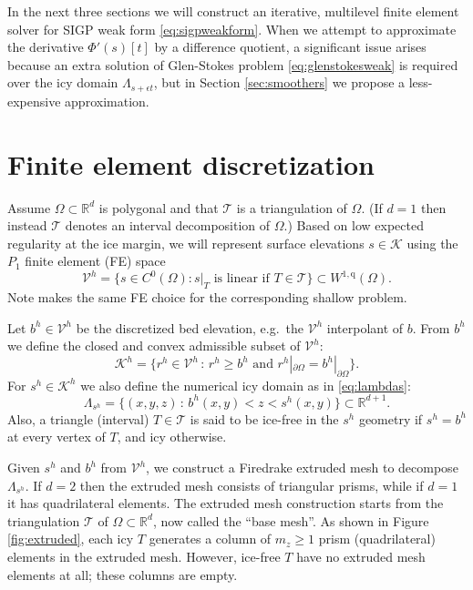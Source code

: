 \documentclass[letterpaper,final,12pt,reqno]{amsart}
\theoremstyle{claim}
\newcommand{\eps}{\epsilon}
\newcommand{\RR}{\mathbb{R}}
\newcommand{\qq}{{\text{q}}}
\numberwithin{equation}{section}
\numberwithin{figure}{section}
\numberwithin{table}{section}
\numberwithin{theorem}{section}
\begin{document}
In the next three sections we will construct an iterative, multilevel finite element solver for SIGP weak form \eqref{eq:sigpweakform}.  When we attempt to approximate the derivative $\Phi'(s)[t]$ by a difference quotient, a significant issue arises because an extra solution of Glen-Stokes problem \eqref{eq:glenstokesweak} is required over the icy domain $\Lambda_{s+\eps t}$, but in Section \ref{sec:smoothers} we propose a less-expensive approximation.


\section{Finite element discretization} \label{sec:fe}

Assume $\Omega \subset \RR^d$ is polygonal and that $\mathcal{T}$ is a triangulation of $\Omega$.  (If $d=1$ then instead $\mathcal{T}$ denotes an interval decomposition of $\Omega$.)  Based on low expected regularity at the ice margin, we will represent surface elevations $s\in \mathcal{K}$ using the $P_1$ finite element (FE) space
\begin{equation}
\mathcal{V}^h = \{s \in C^0(\Omega) : s|_T \text{ is linear if } T \in \mathcal{T}\} \subset W^{1,\qq}(\Omega).
\end{equation}
Note \cite{JouvetBueler2012} makes the same FE choice for the corresponding shallow problem.

Let $b^h \in \mathcal{V}^h$ be the discretized bed elevation, e.g.~the $\mathcal{V}^h$ interpolant of $b$.  From $b^h$ we define the closed and convex admissible subset of $\mathcal{V}^h$:
\begin{equation}
\mathcal{K}^h = \{r^h \in \mathcal{V}^h \,:\, r^h \ge b^h \text{ and } r^h|_{\partial\Omega} = b^h|_{\partial\Omega}\}.  \label{eq:feK}
\end{equation}
For $s^h\in \mathcal{K}^h$ we also define the numerical icy domain as in \eqref{eq:lambdas}:
\begin{equation}
\Lambda_{s^h} = \{(x,y,z)\,:\,b^h(x,y) < z < s^h(x,y)\} \subset \RR^{d+1}.  \label{eq:felambdas}
\end{equation}
Also, a triangle (interval) $T\in\mathcal{T}$ is said to be ice-free in the $s^h$ geometry if $s^h=b^h$ at every vertex of $T$, and icy otherwise.

Given $s^h$ and $b^h$ from $\mathcal{V}^h$, we construct a Firedrake extruded mesh \cite{McRaeetal2016} to decompose $\Lambda_{s^h}$.  If $d=2$ then the extruded mesh consists of triangular prisms, while if $d=1$ it has quadrilateral elements.  The extruded mesh construction starts from the triangulation $\mathcal{T}$ of $\Omega \subset \RR^d$, now called the ``base mesh''.  As shown in Figure \ref{fig:extruded}, each icy $T$ generates a column of $m_z \ge 1$ prism (quadrilateral) elements in the extruded mesh.  However, ice-free $T$ have no extruded mesh elements at all; these columns are empty.
\end{document}
